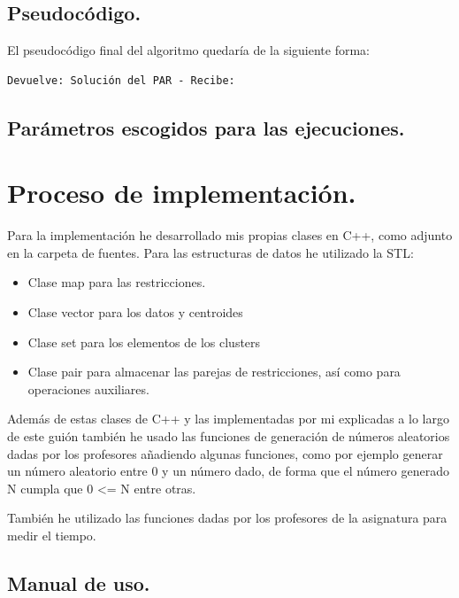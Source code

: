 \documentclass[12pt, spanish]{article}
\begin{document}
\newpage


\subsection{Pseudocódigo.}

El pseudocódigo final del algoritmo quedaría de la siguiente forma:

\begin{lstlisting}
Devuelve: Solución del PAR - Recibe: 
\end{lstlisting}


\subsection{Parámetros escogidos para las ejecuciones.}





\section{Proceso de implementación.}

Para la implementación he desarrollado mis propias clases en C++, como adjunto en la carpeta de fuentes. Para las estructuras de datos he utilizado la STL:

\begin{itemize}
	\item Clase map para las restricciones.
	\item Clase vector para los datos y centroides
	\item Clase set para los elementos de los clusters
	\item Clase pair para almacenar las parejas de restricciones, así como para operaciones auxiliares.
\end{itemize}

Además de estas clases de C++ y las implementadas por mi explicadas a lo largo de este guión también he usado las funciones de generación de números aleatorios dadas por los profesores añadiendo algunas funciones, como por ejemplo generar un número aleatorio entre 0 y un número dado, de forma que el número generado N cumpla que 0 <= N entre otras.

También he utilizado las funciones dadas por los profesores de la asignatura para medir el tiempo.


\subsection{Manual de uso.}
\end{document}
